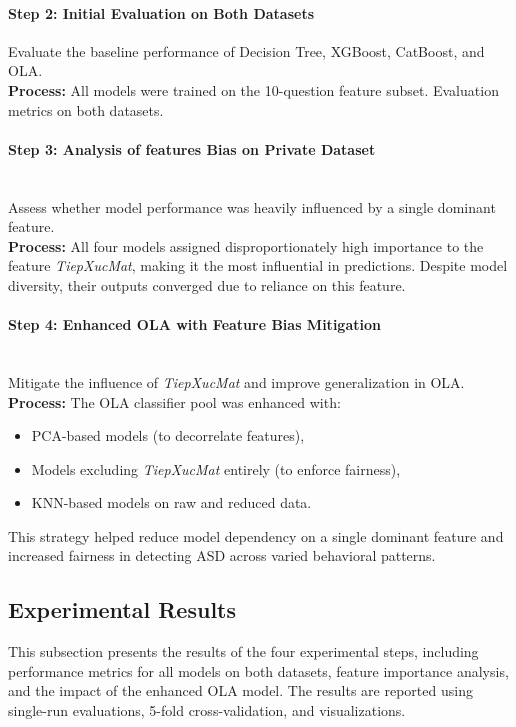 \documentclass[conference]{IEEEtran}
\begin{document}
\paragraph{\textbf{Step 2: Initial Evaluation on Both Datasets}}

Evaluate the baseline performance of Decision Tree, XGBoost, CatBoost, and OLA.\\
\textbf{Process:} All models were trained on the 10-question feature subset. Evaluation metrics on both datasets.

\paragraph{\textbf{Step 3: Analysis of features Bias on Private Dataset}}\\

Assess whether model performance was heavily influenced by a single dominant feature.\\
\textbf{Process:} All four models assigned disproportionately high importance to the feature \textit{TiepXucMat}, making it the most influential in predictions. Despite model diversity, their outputs converged due to reliance on this feature.

\paragraph{\textbf{Step 4: Enhanced OLA with Feature Bias Mitigation}}\\

Mitigate the influence of \textit{TiepXucMat} and improve generalization in OLA.\\
\textbf{Process:} The OLA classifier pool was enhanced with:
\begin{itemize}
\item PCA-based models (to decorrelate features),
\item Models excluding \textit{TiepXucMat} entirely (to enforce fairness),
\item KNN-based models on raw and reduced data.
\end{itemize}
This strategy helped reduce model dependency on a single dominant feature and increased fairness in detecting ASD across varied behavioral patterns.



\subsection{Experimental Results}
This subsection presents the results of the four experimental steps, including performance metrics for all models on both datasets, feature importance analysis, and the impact of the enhanced OLA model. The results are reported using single-run evaluations, 5-fold cross-validation, and visualizations.
\end{document}
